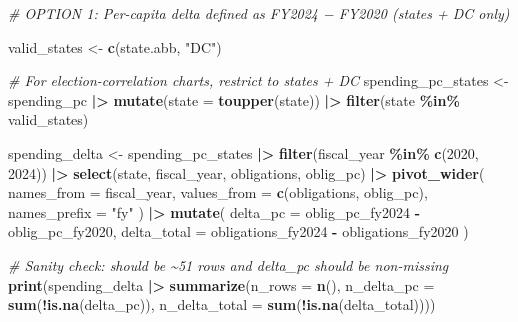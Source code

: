 \documentclass[
  11pt,
]{article}
\newenvironment{Shaded}{\begin{snugshade}}{\end{snugshade}}
\newcommand{\AttributeTok}[1]{\textcolor[rgb]{0.13,0.29,0.53}{#1}}
\newcommand{\CommentTok}[1]{\textcolor[rgb]{0.56,0.35,0.01}{\textit{#1}}}
\newcommand{\DecValTok}[1]{\textcolor[rgb]{0.00,0.00,0.81}{#1}}
\newcommand{\FunctionTok}[1]{\textcolor[rgb]{0.13,0.29,0.53}{\textbf{#1}}}
\newcommand{\NormalTok}[1]{#1}
\newcommand{\OtherTok}[1]{\textcolor[rgb]{0.56,0.35,0.01}{#1}}
\newcommand{\SpecialCharTok}[1]{\textcolor[rgb]{0.81,0.36,0.00}{\textbf{#1}}}
\newcommand{\StringTok}[1]{\textcolor[rgb]{0.31,0.60,0.02}{#1}}
\begin{document}
\begin{Shaded}
\begin{Highlighting}[]
\CommentTok{\# OPTION 1: Per{-}capita delta defined as FY2024 − FY2020 (states + DC only)}

\NormalTok{valid\_states }\OtherTok{\textless{}{-}} \FunctionTok{c}\NormalTok{(state.abb, }\StringTok{"DC"}\NormalTok{)}

\CommentTok{\# For election{-}correlation charts, restrict to states + DC}
\NormalTok{spending\_pc\_states }\OtherTok{\textless{}{-}}\NormalTok{ spending\_pc }\SpecialCharTok{|\textgreater{}}
  \FunctionTok{mutate}\NormalTok{(}\AttributeTok{state =} \FunctionTok{toupper}\NormalTok{(state)) }\SpecialCharTok{|\textgreater{}}
  \FunctionTok{filter}\NormalTok{(state }\SpecialCharTok{\%in\%}\NormalTok{ valid\_states)}

\NormalTok{spending\_delta }\OtherTok{\textless{}{-}}\NormalTok{ spending\_pc\_states }\SpecialCharTok{|\textgreater{}}
  \FunctionTok{filter}\NormalTok{(fiscal\_year }\SpecialCharTok{\%in\%} \FunctionTok{c}\NormalTok{(}\DecValTok{2020}\NormalTok{, }\DecValTok{2024}\NormalTok{)) }\SpecialCharTok{|\textgreater{}}
  \FunctionTok{select}\NormalTok{(state, fiscal\_year, obligations, oblig\_pc) }\SpecialCharTok{|\textgreater{}}
  \FunctionTok{pivot\_wider}\NormalTok{(}
    \AttributeTok{names\_from =}\NormalTok{ fiscal\_year,}
    \AttributeTok{values\_from =} \FunctionTok{c}\NormalTok{(obligations, oblig\_pc),}
    \AttributeTok{names\_prefix =} \StringTok{"fy"}
\NormalTok{  ) }\SpecialCharTok{|\textgreater{}}
  \FunctionTok{mutate}\NormalTok{(}
    \AttributeTok{delta\_pc =}\NormalTok{ oblig\_pc\_fy2024 }\SpecialCharTok{{-}}\NormalTok{ oblig\_pc\_fy2020,}
    \AttributeTok{delta\_total =}\NormalTok{ obligations\_fy2024 }\SpecialCharTok{{-}}\NormalTok{ obligations\_fy2020}
\NormalTok{  )}

\CommentTok{\# Sanity check: should be \textasciitilde{}51 rows and delta\_pc should be non{-}missing}
\FunctionTok{print}\NormalTok{(spending\_delta }\SpecialCharTok{|\textgreater{}}
        \FunctionTok{summarize}\NormalTok{(}\AttributeTok{n\_rows =} \FunctionTok{n}\NormalTok{(), }\AttributeTok{n\_delta\_pc =} \FunctionTok{sum}\NormalTok{(}\SpecialCharTok{!}\FunctionTok{is.na}\NormalTok{(delta\_pc)), }\AttributeTok{n\_delta\_total =} \FunctionTok{sum}\NormalTok{(}\SpecialCharTok{!}\FunctionTok{is.na}\NormalTok{(delta\_total))))}
\end{Highlighting}
\end{Shaded}
\end{document}
